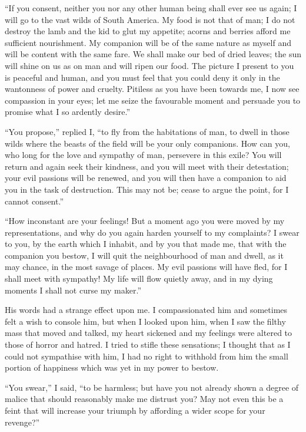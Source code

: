 \documentclass[12pt,openright]{book}
\begin{document}
“If you consent, neither you nor any other human being shall ever see us again; I will go to the vast wilds of South America. My food is not that of man; I do not destroy the lamb and the kid to glut my appetite; acorns and berries afford me sufficient nourishment. My companion will be of the same nature as myself and will be content with the same fare. We shall make our bed of dried leaves; the sun will shine on us as on man and will ripen our food. The picture I present to you is peaceful and human, and you must feel that you could deny it only in the wantonness of power and cruelty. Pitiless as you have been towards me, I now see compassion in your eyes; let me seize the favourable moment and persuade you to promise what I so ardently desire.”

“You propose,” replied I, “to fly from the habitations of man, to dwell in those wilds where the beasts of the field will be your only companions. How can you, who long for the love and sympathy of man, persevere in this exile? You will return and again seek their kindness, and you will meet with their detestation; your evil passions will be renewed, and you will then have a companion to aid you in the task of destruction. This may not be; cease to argue the point, for I cannot consent.”

“How inconstant are your feelings! But a moment ago you were moved by my representations, and why do you again harden yourself to my complaints? I swear to you, by the earth which I inhabit, and by you that made me, that with the companion you bestow, I will quit the neighbourhood of man and dwell, as it may chance, in the most savage of places. My evil passions will have fled, for I shall meet with sympathy! My life will flow quietly away, and in my dying moments I shall not curse my maker.”

His words had a strange effect upon me. I compassionated him and sometimes felt a wish to console him, but when I looked upon him, when I saw the filthy mass that moved and talked, my heart sickened and my feelings were altered to those of horror and hatred. I tried to stifle these sensations; I thought that as I could not sympathise with him, I had no right to withhold from him the small portion of happiness which was yet in my power to bestow.

“You swear,” I said, “to be harmless; but have you not already shown a degree of malice that should reasonably make me distrust you? May not even this be a feint that will increase your triumph by affording a wider scope for your revenge?”
\end{document}
